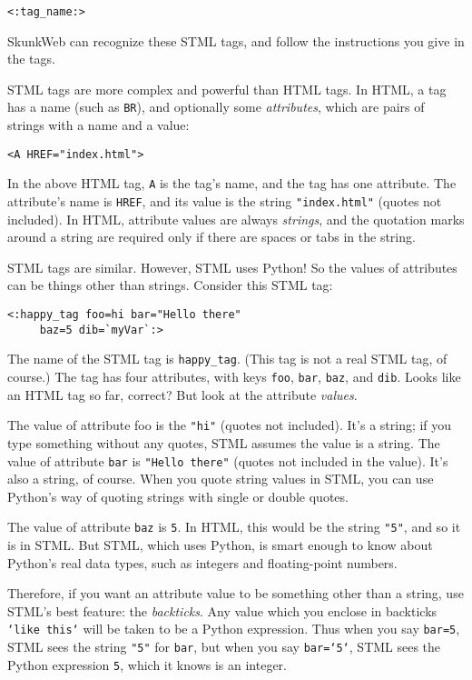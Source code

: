 \documentclass{manual}
\begin{document}
\begin{verbatim}
<:tag_name:>
\end{verbatim}


SkunkWeb can recognize these STML tags, and follow the instructions
you give in the tags.

STML tags are more complex and powerful than HTML tags. 
In HTML, a tag has a name (such as \texttt{BR}), 
and optionally some \emph{attributes}, which are pairs 
of strings with a name and a value:

\begin{verbatim}
<A HREF="index.html">
\end{verbatim}


In the above HTML tag, \texttt{A} is the tag's name, 
and the tag has one attribute. The attribute's name is 
\texttt{HREF}, and its value is the string \texttt{"index.html"} 
(quotes not included). In HTML, attribute values are always 
\emph{strings}, and the quotation marks around a string
are required only if there are spaces or tabs in the string.

STML tags are similar. However, STML uses Python! 
So the values of attributes can be things other than strings. 
Consider this STML tag:

\begin{verbatim}
<:happy_tag foo=hi bar="Hello there" 
     baz=5 dib=`myVar`:>
\end{verbatim}

The name of the STML tag is \texttt{happy_tag}. 
(This tag is not a real STML tag, of course.) 
The tag has four attributes, with keys \texttt{foo}, 
\texttt{bar}, \texttt{baz}, and \texttt{dib}. 
Looks like an HTML tag so far, correct? 
But look at the attribute \emph{values}.

The value of attribute foo is the \texttt{"hi"} 
(quotes not included). It's a string; if you type something 
without any quotes, STML assumes the value is a string.
The value of attribute \texttt{bar} is \texttt{"Hello there"} 
(quotes not included in the value). It's also a string, 
of course. When you quote string values in STML, 
you can use Python's way of quoting strings with single 
or double quotes.

The value of attribute \texttt{baz} is \texttt{5}. 
In HTML, this would be the string \texttt{"5"}, and so it 
is in STML. But STML, which uses Python, is smart enough 
to know about Python's real data types, such as integers 
and floating-point numbers.

Therefore, if you want an attribute value to be something other than a
string, use STML's best feature: the \emph{backticks}. Any value which
you enclose in backticks \texttt{`like this`} will be taken to be a
Python expression.  Thus when you say \texttt{bar=5}, STML sees the
string \texttt{"5"} for \texttt{bar}, but when you say
\texttt{bar=`5`}, STML sees the Python expression \texttt{5}, which it
knows is an integer.  
\end{document}
